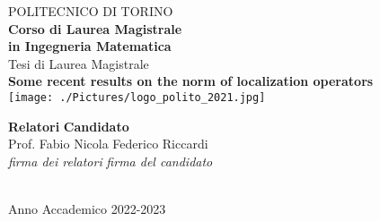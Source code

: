 \begin{titlepage}


\begin{center}

{\huge POLITECNICO DI TORINO}\\[1.5cm]
\textbf{Corso di Laurea Magistrale\\in Ingegneria Matematica}\\[3cm]

{\Large Tesi di Laurea Magistrale}\\[0.5cm]
\textbf{\LARGE Some recent results on the norm of localization operators}\\[2cm]
\texttt{[image: ./Pictures/logo\_polito\_2021.jpg]}
\vspace{4cm}


\begin{minipage}{0.85\textwidth}
\begin{flushleft}\large
\textbf{Relatori} \hfill \textbf{Candidato}\\
Prof. Fabio Nicola \hfill Federico Riccardi\\
\textit{firma dei relatori} \hfill \textit{firma del candidato}\\[0.35cm]
\fillin\ \hfill \fillin
\end{flushleft}
\end{minipage}

\vfill

Anno Accademico 2022-2023
\end{center}

\restoregeometry %

\end{titlepage}
